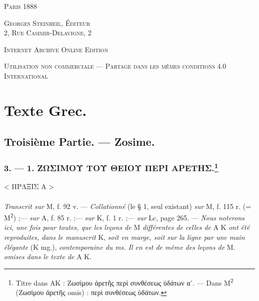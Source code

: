 \documentclass[landscape, a4paper, 11pt, oneside, polutonikogreek, french]{article}
\begin{document}
\begin{titlepage}


	\vspace{\baselineskip}

	{\small\scshape Paris 1888}
	
	{\small\scshape{Georges Steinheil, Éditeur \\2, Rue Casimir-Delavigne, 2}}
	
	\vspace{0.5\baselineskip} %

    \scshape Internet Archive Online Edition  %
	
	{\scshape\small Utilisation non commerciale --- Partage dans les mêmes conditions 4.0 International} %
\end{titlepage}
\pagestyle{fancy}
\fancyhf{}
\cfoot{\bfseries{\thepage}}
\Large
\setlength{\parskip}{1mm plus1mm minus1mm}
\clearpage
\tableofcontents
\clearpage
\section{Texte Grec.}
\subsection{Troisième Partie. --- Zosime.}
\subsubsection[3. --- 1. ΖΩΣΙΜΟΥ ΤΟΥ ΘΕΙΟΥ ΠΕΡΙ ΑΡΕΤΗΣ.]{3. --- 1. ΖΩΣΙΜΟΥ ΤΟΥ ΘΕΙΟΥ ΠΕΡΙ ΑΡΕΤΗΣ.\footnote{Titre dans AK : Ζωσίμου ἀρετῆς περὶ συνθέσεως ὑδάτων αʹ. --- Dans M\textsuperscript{2} (Ζωσίμου ἀρετῆς omis) : περὶ συνθέσεως ὑδάτων.}}
\begin{center}
< ΠΡΛΞΙΣ Α >
\end{center}
\paragraph{}
\emph{Transcrit sur} M, f. 92 v. --- \emph{Collationné} (le § 1, seul existant) \emph{sur} M, f. 115 r. (= M\textsuperscript{2}) ;--- \emph{sur} A, f. 85 r. ;--- \emph{sur} K, f. 1 r. ;--- \emph{sur} Lc, page 265. --- \emph{Nous noterons ici, une fois pour toutes, que les leçons de} M \emph{différentes de celles de} A K \emph{ont été reproduites, dans le manuscrit} K, \emph{soit en marge, soit sur la ligne par une main élégante} (K mg.), \emph{contemporaine du ms. Il en est de même des leçons de} M. \emph{omises dans le texte de} A K.
\end{document}
